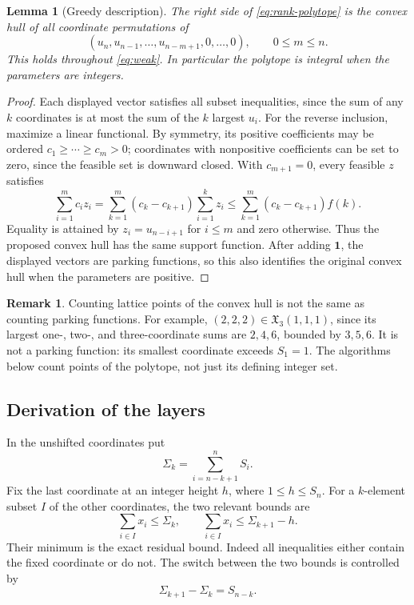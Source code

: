 \documentclass[11pt]{article}
\newtheorem{lemma}[theorem]{Lemma}
\theoremstyle{definition}
\newtheorem{remark}[theorem]{Remark}
\newcommand{\one}{\mathbf 1}
\newcommand{\X}{\mathfrak X}
\numberwithin{equation}{section}
\begin{document}
\begin{lemma}[Greedy description]
\label{lem:greedy}
The right side of \eqref{eq:rank-polytope} is the convex hull of all coordinate
permutations of
\[
 (u_n,u_{n-1},\ldots,u_{n-m+1},0,\ldots,0),\qquad 0\le m\le n.
\]
This holds throughout \eqref{eq:weak}. In particular the polytope is integral
when the parameters are integers.
\end{lemma}
\begin{proof}
Each displayed vector satisfies all subset inequalities, since the sum of
any $k$ coordinates is at most the sum of the $k$ largest $u_i$.
For the reverse inclusion, maximize a linear functional. By symmetry, its
positive coefficients may be ordered $c_1\ge\cdots\ge c_m>0$; coordinates
with nonpositive coefficients can be set to zero, since the feasible set is
downward closed. With $c_{m+1}=0$, every feasible $z$ satisfies
\[
 \sum_{i=1}^m c_i z_i
 =\sum_{k=1}^m(c_k-c_{k+1})\sum_{i=1}^kz_i
 \le\sum_{k=1}^m(c_k-c_{k+1})f(k).
\]
Equality is attained by $z_i=u_{n-i+1}$ for $i\le m$ and zero otherwise.
Thus the proposed convex hull has the same support function. After adding
$\one$, the displayed vectors are parking functions, so this also identifies
the original convex hull when the parameters are positive.
\end{proof}

\begin{remark}
Counting lattice points of the convex hull is not the same as counting
parking functions. For example, $(2,2,2)\in\X_3(1,1,1)$, since its largest
one-, two-, and three-coordinate sums are $2,4,6$, bounded by $3,5,6$.
It is not a parking function: its smallest coordinate exceeds $S_1=1$.
The algorithms below count points of the polytope, not just its defining
integer set.
\end{remark}

\subsection{Derivation of the layers}
In the unshifted coordinates put
\[
 \Sigma_k=\sum_{i=n-k+1}^n S_i.
\]
Fix the last coordinate at an integer height $h$, where $1\le h\le S_n$.
For a $k$-element subset $I$ of the other coordinates, the two relevant
bounds are
\[
 \sum_{i\in I}x_i\le\Sigma_k,
 \qquad \sum_{i\in I}x_i\le\Sigma_{k+1}-h.
\]
Their minimum is the exact residual bound. Indeed all inequalities either
contain the fixed coordinate or do not. The switch between the two bounds
is controlled by
\[
 \Sigma_{k+1}-\Sigma_k=S_{n-k}.
\]
\end{document}
